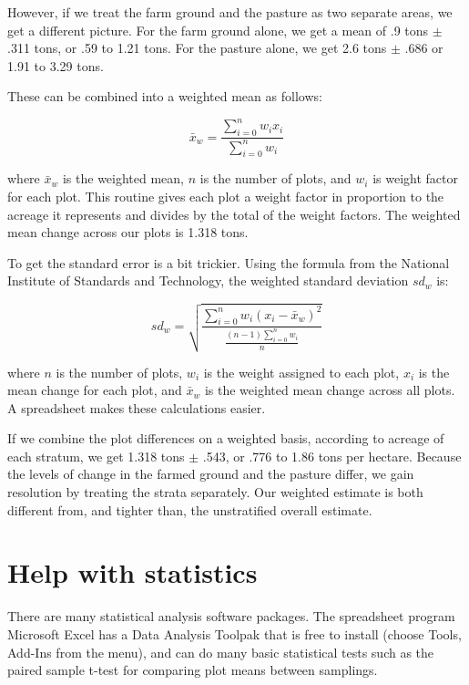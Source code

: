 \documentclass[11pt,letterpaper,oneside,onecolumn]{memoir}
\begin{document}
However, if we treat the farm ground and the pasture as two separate areas, we get a different picture. For the farm ground alone, we get a mean of .9 tons $\pm$ .311 tons, or .59 to 1.21 tons. For the pasture alone, we get 2.6 tons $\pm$ .686 or 1.91 to 3.29 tons.

These can be combined into a weighted mean as follows:

\begin{equation}\bar{x}_w = \frac{\displaystyle\sum\limits_{i=0}^n w_i x_i}{\displaystyle\sum\limits_{i=0}^n w_i}\end{equation}


\noindent where $\bar{x}_{w}$ is the weighted mean, $n$ is the number of plots, and $w_i$ is weight factor for each plot. This routine gives each plot a weight factor in proportion to the acreage it represents and divides by the total of the weight factors. The weighted mean change across our plots is 1.318 tons.

To get the standard error is a bit trickier. Using the formula from the National Institute of Standards and Technology, the weighted standard deviation $sd_{w}$ is:

\begin{equation}sd_{w} = \sqrt{\frac{\displaystyle\sum\limits_{i=0}^n w_{i}(x_{i} - \bar{x}_{w})^{2}}{\frac{(n - 1) \displaystyle\sum\limits_{i=0}^n w_{i}}{n}}}\end{equation}

\noindent where $n$ is the number of plots, $w_{i}$ is the weight assigned to each plot, $x_{i}$ is the mean change for each plot, and $\bar{x}_{w}$ is the weighted mean change across all plots. A spreadsheet makes these calculations easier.

If we combine the plot differences on a weighted basis, according to acreage of each stratum, we get 1.318 tons $\pm$ .543, or .776 to 1.86 tons per hectare. Because the levels of change in the farmed ground and the pasture differ, we gain resolution by treating the strata separately. Our weighted estimate is both different from, and tighter than, the unstratified overall estimate.

\section{Help with statistics}

There are many statistical analysis software packages. The spreadsheet program Microsoft Excel has a Data Analysis Toolpak that is free to install (choose Tools, Add-Ins from the menu), and can do many basic statistical tests such as the paired sample t-test for comparing plot means between samplings.
\end{document}
